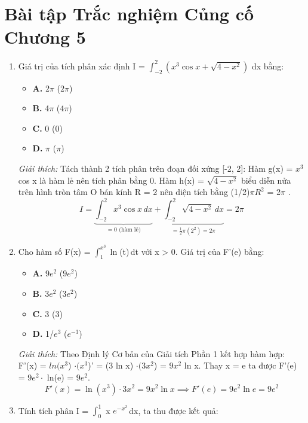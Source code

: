 \documentclass[11pt,a4paper,oneside]{book}
\begin{document}
\section{Bài tập Trắc nghiệm Củng cố Chương 5}
\begin{enumerate}[label=\textbf{Câu \arabic*:}, leftmargin=2.2em, itemsep=8pt]
  \item Giá trị của tích phân xác định I = $\int_{-2}^{2} \left(x^3 \cos x + \sqrt{4 - x^2}\right)$ dx bằng:
  \begin{itemize}[label={}, leftmargin=1em, itemsep=2pt]
    \item \textbf{A.} 2$\pi$  \quad ($2\pi$)
    \item \textbf{B.} 4$\pi$  \quad ($4\pi$)
    \item \textbf{C.} 0 \quad ($0$)
    \item \textbf{D.} $\pi$  \quad ($\pi$)
  \end{itemize}
  \vspace{2pt}
   \textit{Giải thích:} Tách thành 2 tích phân trên đoạn đối xứng [-2, 2]: Hàm g(x) = $x^3$ cos x là hàm lẻ nên tích phân bằng 0. Hàm h(x) = $\sqrt{4 - x^2}$ biểu diễn nửa trên hình tròn tâm O bán kính R = 2 nên diện tích bằng (1/2)$\pi R^2$ = 2$\pi$ .
  \[ I = \underbrace{\int_{-2}^2 x^3\cos x\,dx}_{=0 \text{ (hàm lẻ)}} + \underbrace{\int_{-2}^2 \sqrt{4-x^2}\,dx}_{=\frac{1}{2}\pi(2^2) = 2\pi} = 2\pi \]
  \item Cho hàm số F(x) = $\int_1^{x^3} \ln$(t)\,dt với x > 0. Giá trị của F'(e) bằng:
  \begin{itemize}[label={}, leftmargin=1em, itemsep=2pt]
    \item \textbf{A.} $9e^2$ \quad ($9e^2$)
    \item \textbf{B.} $3e^2$ \quad ($3e^2$)
    \item \textbf{C.} 3 \quad ($3$)
    \item \textbf{D.} 1/$e^3$ \quad ($e^{-3}$)
  \end{itemize}
  \vspace{2pt}
   \textit{Giải thích:} Theo Định lý Cơ bản của Giải tích Phần 1 kết hợp hàm hợp: F'(x) = $ln(x^3$) $\cdot (x^3$)' = (3 ln x) $\cdot (3x^2$) = $9x^2$ ln x. Thay x = e ta được F'(e) = $9e^2 \cdot$  ln(e) = $9e^2$.
  \[ F'(x) = \ln(x^3)\cdot 3x^2 = 9x^2\ln x \implies F'(e) = 9e^2 \ln e = 9e^2 \]
  \item Tính tích phân I = $\int_0^1$ x $e^{-x^2}$\,dx, ta thu được kết quả:

\end{enumerate}
\end{document}
